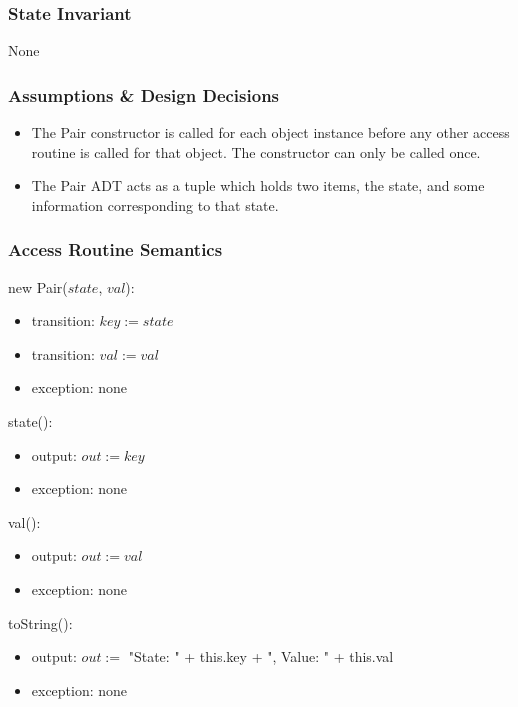 \documentclass[12pt]{article}
\begin{document}
\subsubsection* {State Invariant}

None

\subsubsection* {Assumptions \& Design Decisions}

\begin{itemize}
\item The Pair constructor is called for each object instance before any
  other access routine is called for that object.  The constructor can only be
  called once.
\item The Pair ADT acts as a tuple which holds two items, the state, and some information corresponding to that state.
\end{itemize}

\subsubsection* {Access Routine Semantics}

new Pair($state$, $val$):
\begin{itemize}
\item transition: $key := state$
\item transition: $val := val$
\item exception: none
\end{itemize}

\noindent state():
\begin{itemize}
\item output: $out := key$
\item exception: none
\end{itemize}

\noindent val():
\begin{itemize}
\item output: $out := val$
\item exception: none
\end{itemize}

\noindent toString():
\begin{itemize}
\item output: $out := $ "State: " + this.key + ", Value: " + this.val
\item exception: none
\end{itemize}
\end{document}
